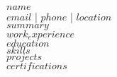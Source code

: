 \documentclass{article}
\begin{document}
$name$\\
$email$ | $phone$ | $location$\\
$summary$\\
$work_experience$\\
$education$\\
$skills$\\
$projects$\\
$certifications$
\end{document}
